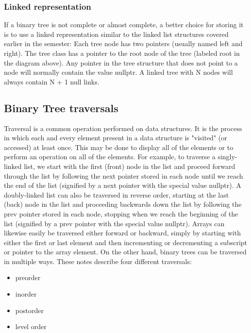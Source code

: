 \documentclass{report}
\begin{document}
    \bigbreak \noindent 
    \subsubsection{Linked representation}
    \bigbreak \noindent 
    If a binary tree is not complete or almost complete, a better choice for storing it is to use a linked representation similar to the linked list structures covered earlier in the semester:
    \bigbreak \noindent 
    Each tree node has two pointers (usually named left and right). The tree class has a pointer to the root node of the tree (labeled root in the diagram above).
    \bigbreak \noindent 
    Any pointer in the tree structure that does not point to a node will normally contain the value nullptr. A linked tree with N nodes will always contain N + 1 null links.

    \bigbreak \noindent 
    \subsection{Binary Tree traversals}
    \bigbreak \noindent 
    \begin{concept}
       Traversal is a common operation performed on data structures. It is the process in which each and every element present in a data structure is "visited" (or accessed) at least once. This may be done to display all of the elements or to perform an operation on all of the elements.
       \bigbreak \noindent 
       For example, to traverse a singly-linked list, we start with the first (front) node in the list and proceed forward through the list by following the next pointer stored in each node until we reach the end of the list (signified by a next pointer with the special value nullptr). A doubly-linked list can also be traversed in reverse order, starting at the last (back) node in the list and proceeding backwards down the list by following the prev pointer stored in each node, stopping when we reach the beginning of the list (signified by a prev pointer with the special value nullptr). Arrays can likewise easily be traversed either forward or backward, simply by starting with either the first or last element and then incrementing or decrementing a subscript or pointer to the array element.
       \bigbreak \noindent 
       On the other hand, binary trees can be traversed in multiple ways. These notes describe four different traversals: 
       \begin{itemize}
           \item preorder
           \item inorder
           \item postorder
           \item level order
       \end{itemize}
    \end{concept}
\end{document}

